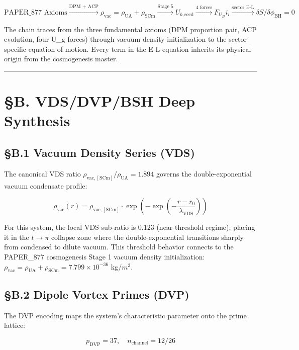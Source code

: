 \documentclass[12pt,a4paper]{article}
\begin{document}
\begin{equation}
\text{PAPER\_877 Axioms} \xrightarrow{\text{DPM + ACP}} \rho_{\mathrm{vac}} = \rho_{\mathrm{UA}} + \rho_{\mathrm{SCm}} \xrightarrow{\text{Stage 5}} U_{b,\mathrm{seed}} \xrightarrow{\text{4 forces}} F_U_Bi_i \xrightarrow{\text{sector E-L}} \delta S/\delta \phi_{\mathrm{BH}} = 0
\end{equation}

The chain traces from the three fundamental axioms (DPM proportion pair, ACP evolution, four U\_g forces) through vacuum density initialization to the sector-specific equation of motion. Every term in the E-L equation inherits its physical origin from the cosmogenesis master.

\medskip\hrule\medskip

\section{\S{}B. VDS/DVP/BSH Deep Synthesis}

\subsection{\S{}B.1 Vacuum Density Series (VDS)}

The canonical VDS ratio $\rho_{\mathrm{vac,[SCm]}} / \rho_{\mathrm{UA}} = 1.894$ governs the double-exponential vacuum condensate profile:

\begin{equation}
\rho_{\mathrm{vac}}(r) = \rho_{\mathrm{vac,[SCm]}} \cdot \exp\!\left(-\exp\!\left(-\frac{r - r_0}{\lambda_{\mathrm{VDS}}}\right)\right)
\end{equation}

For this system, the local VDS sub-ratio is $0.123$ (near-threshold regime), placing it in the $t \to \pi$ collapse zone where the double-exponential transitions sharply from condensed to dilute vacuum. This threshold behavior connects to the PAPER\_877 cosmogenesis Stage 1 vacuum density initialization: $\rho_{\mathrm{vac}} = \rho_{\mathrm{UA}} + \rho_{\mathrm{SCm}} = 7.799 \times 10^{-36}$ kg/$m^{3}$.

\subsection{\S{}B.2 Dipole Vortex Primes (DVP)}

The DVP encoding maps the system's characteristic parameter onto the prime lattice:

\begin{equation}
p_{\mathrm{DVP}} = 37, \quad n_{\mathrm{channel}} = 12/26
\end{equation}
\end{document}
